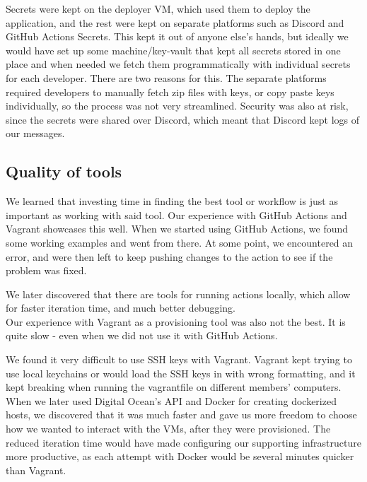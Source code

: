 Secrets were kept on the deployer VM, which used them to deploy the application, and the rest were kept on separate platforms such as Discord and GitHub Actions Secrets. This kept it out of anyone else's hands, but ideally we would have set up some machine/key-vault that kept all secrets stored in one place and when needed we fetch them programmatically with individual secrets for each developer. There are two reasons for this. The separate platforms required developers to manually fetch zip files with keys, or copy paste keys individually, so the process was not very streamlined. Security was also at risk, since the secrets were shared over Discord, which meant that Discord kept logs of our messages.

\subsection{Quality of tools}
We learned that investing time in finding the best tool or workflow is just as important as working with said tool. Our experience with GitHub Actions and Vagrant showcases this well. When we started using GitHub Actions, we found some working examples and went from there. At some point, we encountered an error, and were then left to keep pushing changes to the action to see if the problem was fixed. 

We later discovered that there are tools for running actions locally, which allow for faster iteration time, and much better debugging. \\

\noindent Our experience with Vagrant as a provisioning tool was also not the best. It is quite slow - even when we did not use it with GitHub Actions. 

We found it very difficult to use SSH keys with Vagrant. Vagrant kept trying to use local keychains or would load the SSH keys in with wrong formatting, and it kept breaking when running the vagrantfile on different members' computers. When we later used Digital Ocean's API and Docker for creating dockerized hosts, we discovered that it was much faster and gave us more freedom to choose how we wanted to interact with the VMs, after they were provisioned. The reduced iteration time would have made configuring our supporting infrastructure more productive, as each attempt with Docker would be several minutes quicker than Vagrant. 

